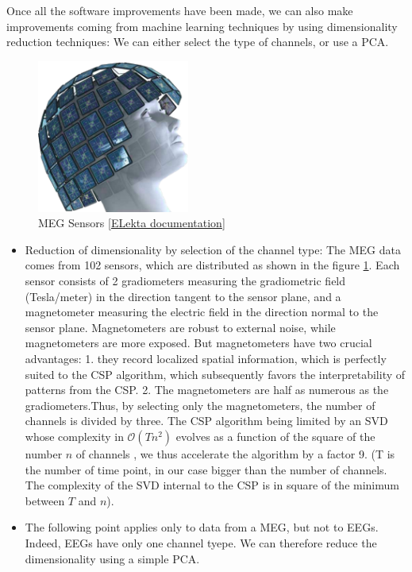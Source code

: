 Once all the software improvements have been made, we can also make improvements coming from machine learning techniques by using dimensionality reduction techniques: We can either select the type of channels, or use a PCA.

\begin{figure}[ht]
    \centering
    \includegraphics[width=5cm]{images_report/sensor/sensors_elekta.png}
    \caption[MEG Sensors]%
    {MEG Sensors [\href{https://www.elekta.com/dam/jcr:ed6d88e7-cd3e-478e-9c4a-3f89ef90ec92/Elekta-Neuromag-TRIUX-Brochure.pdf}{ELekta documentation}]}
    \label{sensors_elekta}
\end{figure}

\begin{itemize}
    \item Reduction of dimensionality by selection of the channel type: The MEG data comes from 102 sensors, which are distributed as shown in the figure \ref{sensors_elekta}. Each sensor consists of 2 gradiometers measuring the gradiometric field (Tesla/meter) in the direction tangent to the sensor plane, and a magnetometer measuring the electric field in the direction normal to the sensor plane. Magnetometers are robust to external noise, while magnetometers are more exposed. But magnetometers have two crucial advantages: 1. they record localized spatial information, which is perfectly suited to the CSP algorithm, which subsequently favors the interpretability of patterns from the CSP. 2. The magnetometers are half as numerous as the gradiometers.Thus, by selecting only the magnetometers, the number of channels is divided by three.  The CSP algorithm being limited by an SVD whose complexity in $\mathcal{O}(T n^2)$ evolves as a function of the square of the number $n$ of channels \cite{dhillonalan}, we thus accelerate the algorithm by a factor 9. (T is the number of time point, in our case bigger than the number of channels. The complexity of the SVD internal to the CSP is in square of the minimum between $T$ and $n$).
    \item The following point applies only to data from a MEG, but not to EEGs. Indeed, EEGs have only one channel tyepe. We can therefore reduce the dimensionality using a simple PCA.
\end{itemize}


